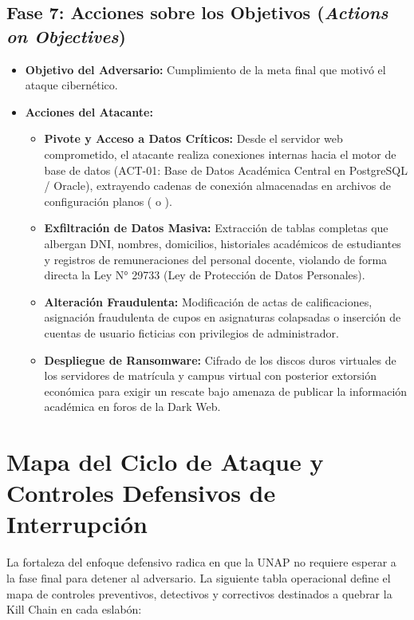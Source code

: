 \subsection*{Fase 7: Acciones sobre los Objetivos (\textit{Actions on Objectives})}
\begin{itemize}
    \item \textbf{Objetivo del Adversario:} Cumplimiento de la meta final que motivó el ataque cibernético.
    \item \textbf{Acciones del Atacante:}
    \begin{itemize}
        \item \textbf{Pivote y Acceso a Datos Críticos:} Desde el servidor web comprometido, el atacante realiza conexiones internas hacia el motor de base de datos (ACT-01: Base de Datos Académica Central en PostgreSQL / Oracle), extrayendo cadenas de conexión almacenadas en archivos de configuración planos ( o ).
        \item \textbf{Exfiltración de Datos Masiva:} Extracción de tablas completas que albergan DNI, nombres, domicilios, historiales académicos de estudiantes y registros de remuneraciones del personal docente, violando de forma directa la Ley N° 29733 (Ley de Protección de Datos Personales).
        \item \textbf{Alteración Fraudulenta:} Modificación de actas de calificaciones, asignación fraudulenta de cupos en asignaturas colapsadas o inserción de cuentas de usuario ficticias con privilegios de administrador.
        \item \textbf{Despliegue de Ransomware:} Cifrado de los discos duros virtuales de los servidores de matrícula y campus virtual con posterior extorsión económica para exigir un rescate bajo amenaza de publicar la información académica en foros de la Dark Web.
    \end{itemize}
\end{itemize}

\newpage
\section{Mapa del Ciclo de Ataque y Controles Defensivos de Interrupción}

La fortaleza del enfoque defensivo radica en que la UNAP no requiere esperar a la fase final para detener al adversario. La siguiente tabla operacional define el mapa de controles preventivos, detectivos y correctivos destinados a quebrar la Kill Chain en cada eslabón:

